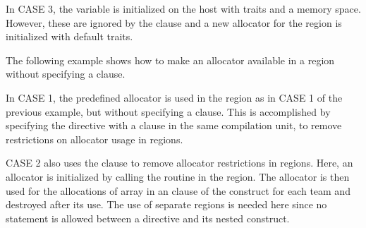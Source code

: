 In CASE 3, the  variable is initialized on the host with traits
and a memory space. However, these are ignored by the  clause
and a new allocator for the  region is initialized with default traits.



The following example shows how to make an allocator available in a  region 
without specifying a  clause.

In CASE 1, the predefined  allocator is used in the 
region as in CASE 1 of the previous example, but without specifying a  clause.
This is accomplished by specifying the  directive with a
 clause in the same compilation unit, to remove
restrictions on allocator usage in  regions.

CASE 2 also uses the  clause to remove allocator
restrictions in  regions. Here, an allocator is initialized
by calling the  routine in the  region.
The allocator is then used for the allocations of array  in 
an  clause of the  construct 
for each team and destroyed after its use.
The use of separate  regions is needed here since
no statement is allowed between a  directive and 
its nested  construct.

